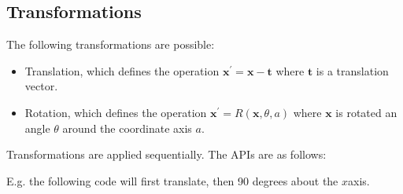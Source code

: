\documentclass[letterpaper,10pt,english]{sphinxmanual}
\begin{document}
\subsection{Transformations}
\label{\detokenize{ImplemSDF:transformations}}
\sphinxAtStartPar
The following transformations are possible:
\begin{itemize}
\item {} 
\sphinxAtStartPar
Translation, which defines the operation \(\mathbf{x}^\prime = \mathbf{x} - \mathbf{t}\) where \(\mathbf{t}\) is a translation vector.

\item {} 
\sphinxAtStartPar
Rotation, which defines the operation \(\mathbf{x}^\prime = R\left(\mathbf{x}, \theta, a\right)\) where \(\mathbf{x}\) is rotated an angle \(\theta\) around the coordinate axis \(a\).

\end{itemize}

\sphinxAtStartPar
Transformations are applied sequentially.
The APIs are as follows:

\begin{sphinxVerbatim}[commandchars=\\\{\}]
\end{sphinxVerbatim}

\sphinxAtStartPar
E.g. the following code will first translate, then 90 degrees about the \(x\)\sphinxhyphen{}axis.

\begin{sphinxVerbatim}[commandchars=\\\{\}]
 

 
\end{sphinxVerbatim}
\end{document}
